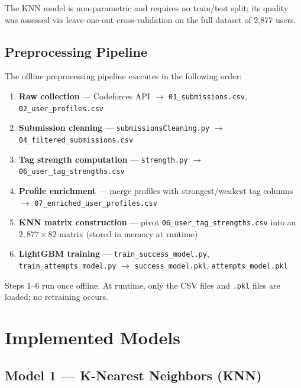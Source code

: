 \documentclass[12pt,a4paper]{article}
\begin{document}
The KNN model is non-parametric and requires no train/test split; its quality
was assessed via leave-one-out cross-validation on the full dataset of 2,877 users.

\subsection*{Preprocessing Pipeline}

The offline preprocessing pipeline executes in the following order:

\begin{enumerate}
    \item \textbf{Raw collection} --- Codeforces API $\rightarrow$
          \texttt{01\_submissions.csv}, \texttt{02\_user\_profiles.csv}
    \item \textbf{Submission cleaning} --- \texttt{submissionsCleaning.py}
          $\rightarrow$ \texttt{04\_filtered\_submissions.csv}
    \item \textbf{Tag strength computation} --- \texttt{strength.py}
          $\rightarrow$ \texttt{06\_user\_tag\_strengths.csv}
    \item \textbf{Profile enrichment} --- merge profiles with strongest/weakest
          tag columns $\rightarrow$ \texttt{07\_enriched\_user\_profiles.csv}
    \item \textbf{KNN matrix construction} --- pivot \texttt{06\_user\_tag\_strengths.csv}
          into an $2{,}877 \times 82$ matrix (stored in memory at runtime)
    \item \textbf{LightGBM training} --- \texttt{train\_success\_model.py},
          \texttt{train\_attempts\_model.py} $\rightarrow$
          \texttt{success\_model.pkl}, \texttt{attempts\_model.pkl}
\end{enumerate}

Steps 1--6 run once offline. At runtime, only the CSV files and \texttt{.pkl}
files are loaded; no retraining occurs.

\section{Implemented Models}

\subsection*{Model 1 --- K-Nearest Neighbors (KNN)}
\end{document}
